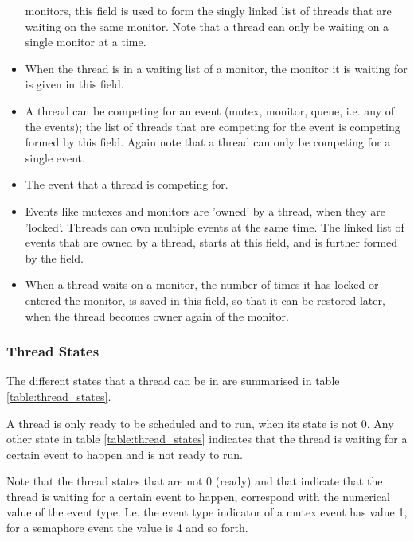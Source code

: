 \begin{itemize}
monitors, this field is used to form the singly linked list of threads that
are waiting on the same monitor. Note that a thread can only be waiting on a
single monitor at a time.
\item {} When the thread is in a
waiting list of a monitor, the monitor it is waiting for is given in this
field.
\item {} A thread can be competing
for an event (mutex, monitor, queue, i.e. any of the events); the list of
threads that are competing for the event is competing formed by this field. Again note that a thread
can only be competing for a single event.
\item {} The event that a thread
is competing for.
\item {} Events like mutexes and
monitors are 'owned' by a thread, when they are 'locked'. Threads can own
multiple events at the same time. The linked list of events that are owned
by a thread, starts at this field, and is further formed by the
 field.
\item {} When a thread waits on a
monitor, the number of times it has locked or entered the monitor, is saved
in this field, so that it can be restored later, when the thread becomes
owner again of the monitor.
\end{itemize}

\subsubsection{Thread States}

The different states that a thread can be in are summarised in table
\ref{table:thread_states}.

A thread is only ready to be scheduled and to run, when its state is not 0.
Any other state in table \ref{table:thread_states} indicates that the thread
is waiting for a certain event to happen and is not ready to run.

Note that the thread states that are not 0 (ready) and that indicate that
the thread is waiting for a certain event to happen, correspond with the
numerical value of the event type. I.e. the event type indicator of a mutex
event has value 1, for a semaphore event the value is 4 and so forth.


